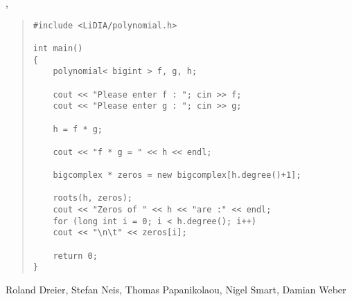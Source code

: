 
\SEEALSO

, 



%



\EXAMPLES

\begin{quote}
\begin{verbatim}
#include <LiDIA/polynomial.h>

int main()
{
    polynomial< bigint > f, g, h;

    cout << "Please enter f : "; cin >> f;
    cout << "Please enter g : "; cin >> g;

    h = f * g;

    cout << "f * g = " << h << endl;

    bigcomplex * zeros = new bigcomplex[h.degree()+1];

    roots(h, zeros);
    cout << "Zeros of " << h << "are :" << endl;
    for (long int i = 0; i < h.degree(); i++)
    cout << "\n\t" << zeros[i];

    return 0;
}
\end{verbatim}
\end{quote}



\AUTHOR

Roland Dreier, Stefan Neis, Thomas Papanikolaou, Nigel Smart, Damian Weber
